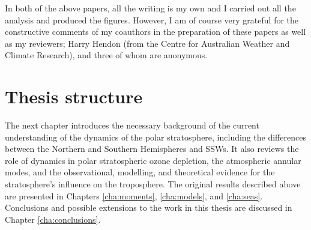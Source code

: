 In both of the above papers, all the writing is my own and I carried out all the
analysis and produced the figures. However, I am of course very grateful for the
constructive comments of my coauthors in the preparation of these papers as well
as my reviewers; Harry Hendon (from the Centre for Australian Weather and
Climate Research), and three of whom are anonymous.

\section{Thesis structure}

The next chapter introduces the necessary background of the current
understanding of the dynamics of the polar stratosphere, including the
differences between the Northern and Southern Hemispheres and SSWs. It also
reviews the role of dynamics in polar stratospheric ozone depletion, the
atmospheric annular modes, and the observational, modelling, and theoretical
evidence for the stratosphere's influence on the troposphere. The original
results described above are presented in Chapters \ref{cha:moments},
\ref{cha:models}, and \ref{cha:seas}. Conclusions and possible extensions to
the work in this thesis are discussed in Chapter \ref{cha:conclusions}. 










